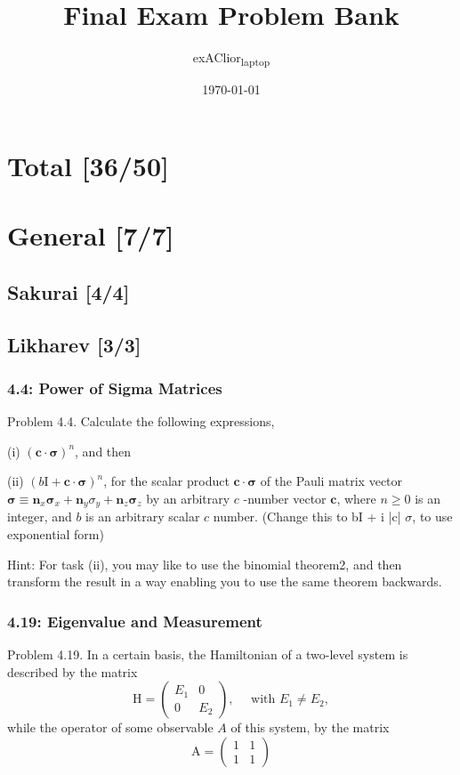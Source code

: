 \documentclass[11pt]{article}
\author{exAClior\textsubscript{laptop}}
\date{\today}
\title{Final Exam Problem Bank}
\begin{document}
\maketitle
\tableofcontents

\section{Total [36/50]}
\label{sec:org859ff84}

\section{General [7/7]}
\label{sec:org167d64d}
\subsection{Sakurai [4/4]}
\label{sec:org157657d}
\subsection{Likharev [3/3]}
\label{sec:org23e48a0}
\subsubsection{4.4: Power of Sigma Matrices}
\label{sec:orgec1a20b}
Problem 4.4. Calculate the following expressions,

(i) \((\mathbf{c} \cdot \boldsymbol{\sigma})^n\), and then

(ii) \((b \mathrm{I}+\mathbf{c} \cdot \boldsymbol{\sigma})^n\), for the scalar product
\(\mathbf{c} \cdot \boldsymbol{\sigma}\) of the Pauli matrix vector \(\boldsymbol{\sigma} \equiv
\mathbf{n}_x \boldsymbol{\sigma}_x+\mathbf{n}_y \sigma_y+\mathbf{n}_z \boldsymbol{\sigma}_z\) by
an arbitrary \(c\) -number vector \(\mathbf{c}\), where \(n \geqslant 0\) is an integer, and
\(b\) is an arbitrary scalar \(c\) number. (Change this to bI + i |c| \(\sigma\), to use
exponential form)

Hint: For task (ii), you may like to use
the binomial theorem2, and then transform the result in a way enabling you to
use the same theorem backwards.
\subsubsection{4.19: Eigenvalue and Measurement}
\label{sec:orgc24f8a3}
Problem 4.19. In a certain basis, the Hamiltonian of a two-level system is
described by the matrix $$ \mathrm{H}=\left(\begin{array}{cc} E_1 & 0 \\ 0 & E_2
\end{array}\right), \quad \text { with } E_1 \neq E_2, $$ while the operator of
some observable \(A\) of this system, by the matrix $$
\mathrm{A}=\left(\begin{array}{ll} 1 & 1 \\ 1 & 1 \end{array}\right) $$
\end{document}

